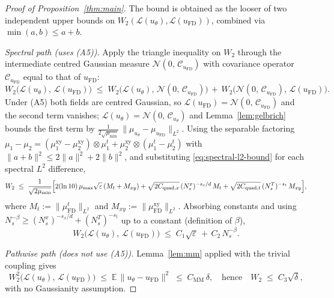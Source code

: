 \documentclass[review,12pt]{elsarticle}
\begin{document}
\begin{proof}[Proof of Proposition~\ref{thm:main}]
The bound is obtained as the looser of two independent upper bounds
on \(W_2(\mathcal L(u_\theta),\mathcal L(u_{\mathrm{FD}}))\), combined
via \(\min(a,b)\le a+b\).

\smallskip
\emph{Spectral path (uses (A5)).} Apply the triangle inequality on
\(W_2\) through the intermediate centred Gaussian measure
\(\mathcal N(0,\,\mathcal C_{u_{\mathrm{FD}}})\) with covariance
operator \(\mathcal C_{u_{\mathrm{FD}}}\) equal to that of
\(u_{\mathrm{FD}}\):
\[
W_2\bigl(\mathcal L(u_\theta),\,\mathcal L(u_{\mathrm{FD}})\bigr)
\;\le\;
W_2\bigl(\mathcal L(u_\theta),\,
\mathcal N(0,\,\mathcal C_{u_{\mathrm{FD}}})\bigr)
\,+\,
W_2\bigl(\mathcal N(0,\,\mathcal C_{u_{\mathrm{FD}}}),\,
\mathcal L(u_{\mathrm{FD}})\bigr).
\]
Under (A5) both fields are centred Gaussian, so
\(\mathcal L(u_{\mathrm{FD}}) = \mathcal N(0,\,\mathcal C_{u_{\mathrm{FD}}})\)
and the second term vanishes;
\(\mathcal L(u_\theta) = \mathcal N(0,\,\mathcal C_{u_\theta})\) and
Lemma~\ref{lem:gelbrich} bounds the first term by
\(\tfrac{1}{2\sqrt{\mu_{\min}}}\,\|\mu_{u_\theta}
- \mu_{u_{\mathrm{FD}}}\|_{L^2}\). Using the separable factoring
\(\mu_1 - \mu_2 = (\mu^{\mathrm{xy}}_1 - \mu^{\mathrm{xy}}_2)
\otimes \mu^t_1
+ \mu^{\mathrm{xy}}_2 \otimes (\mu^t_1 - \mu^t_2)\) with
\(\|a+b\|^2 \le 2\|a\|^2 + 2\|b\|^2\), and substituting
\eqref{eq:spectral-l2-bound} for each spectral \(L^2\) difference,
\[
W_2 \;\le\;
\frac{1}{\sqrt{2\mu_{\min}}}\Bigl[
2(\ln 10)\,\mu_{\max}\sqrt\varepsilon\,(M_t + M_{xy})
+ \sqrt{2 C_{\mathrm{quad},x}}\,(N_s^x)^{-s_x/d}\,M_t
+ \sqrt{2 C_{\mathrm{quad},t}}\,(N_s^T)^{-s_t}\,M_{xy}
\Bigr],
\]
where \(M_t := \|\mu^t_{\mathrm{FD}}\|_{L^2}\) and
\(M_{xy} := \|\mu^{\mathrm{xy}}_{\mathrm{FD}}\|_{L^2}\).
Absorbing constants and using
\(N_s^{-\beta} \ge (N_s^x)^{-s_x/d} + (N_s^T)^{-s_t}\) up to a
constant (definition of \(\beta\)),
\[
W_2\bigl(\mathcal L(u_\theta),\,\mathcal L(u_{\mathrm{FD}})\bigr)
\;\le\; C_1\sqrt\varepsilon \,+\, C_2\,N_s^{-\beta}.
\tag{$\star$}\label{eq:spectral-path}
\]

\smallskip
\emph{Pathwise path (does not use (A5)).} Lemma~\ref{lem:mm} applied
with the trivial coupling gives
\[
W_2^2\bigl(\mathcal L(u_\theta),\,\mathcal L(u_{\mathrm{FD}})\bigr)
\;\le\; \mathbb E\,\|u_\theta - u_{\mathrm{FD}}\|^2
\;\le\; C_{\mathrm{MM}}\,\delta,
\quad\text{hence}\quad
W_2 \;\le\; C_3\sqrt\delta,
\tag{$\dagger$}\label{eq:pde-path}
\]
with no Gaussianity assumption.


\end{proof}
\end{document}
